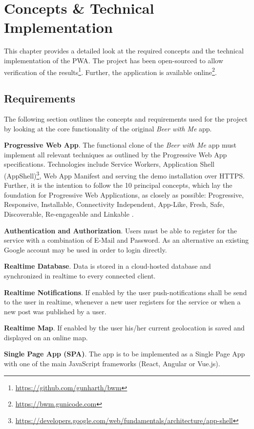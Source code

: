 \chapter{Concepts \& Technical Implementation}
This chapter provides a detailed look at the required concepts and the technical implementation of the PWA. The project has been open-sourced to allow verification of the results\footnote{\url{https://github.com/gunharth/bwm}}. Further, the application is available online\footnote{\url{https://bwm.gunicode.com}}.

\section{Requirements}

The following section outlines the concepts and requirements used for the project by looking at the core functionality of the original \textit{Beer with Me} app.

\textbf{Progressive Web App}. The functional clone of the \textit{Beer with Me} app must implement all relevant techniques as outlined by the Progressive Web App specifications. Technologies include Service Workers, Application Shell (AppShell)\footnote{\url{https://developers.google.com/web/fundamentals/architecture/app-shell}}, Web App Manifest and serving the demo installation over HTTPS. Further, it is the intention to follow the 10 principal concepts, which lay the foundation for Progressive Web Applications, as closely as possible: Progressive, Responsive, Installable, Connectivity Independent, App-Like, Fresh, Safe, Discoverable, Re-engageable and Linkable \citep{osmaniGettingStartedProgressive2015}.

\textbf{Authentication and Authorization}. Users must be able to register for the service with a combination of E-Mail and Password. As an alternative an existing Google account may be used in order to login directly.

\textbf{Realtime Database}. Data is stored in a cloud-hosted database and synchronized in realtime to every connected client.

\textbf{Realtime Notifications}. If enabled by the user push-notifications shall be send to the user in realtime, whenever a new user registers for the service or when a new post was published by a user.

\textbf{Realtime Map}. If enabled by the user his/her current geolocation is saved and displayed on an online map.

\textbf{Single Page App (SPA)}. The app is to be implemented as a Single Page App with one of the main JavaScript frameworks (React, Angular or Vue.js).

